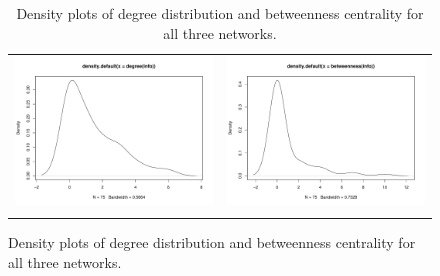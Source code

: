 \documentclass[fleqn,12pt]{wlscirep}
\begin{document}
\begin{figure}
\begin{longtable}[!h]{cc}
\includegraphics[height=.2\textheight, clip=true, trim=1cm 1cm 0cm 2cm]{figures/deg_info.pdf} &
\includegraphics[height=.2\textheight, clip=true, trim=1cm 1cm 0cm 2cm]{figures/cen_info.pdf} \\
\caption{\label{fig:SS_plots} Density plots of degree distribution and betweenness centrality for all three networks.}
\end{longtable}
\end{figure}
\end{document}
